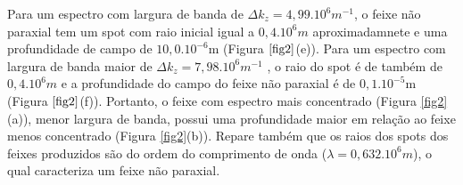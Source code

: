 Para um espectro com largura de banda de $\Delta k_z=4,99.10^{6}m^{-1}$, o feixe n\~ao paraxial tem um spot com raio inicial igual a $0,4.10^6m$ aproximadamnete e uma profundidade de campo de $10,0.10^{-6}$m (Figura $\ref{fig2}$(e)). Para um espectro com largura de banda maior de $\Delta k_z=7,98.10^{6}m^{-1}$ , o raio do spot \'e de tamb\'em de $0,4.10^6m$ e a profundidade do campo do feixe n\~ao paraxial \'e de $0,1.10^{-5}$m (Figura $\ref{fig2}$(f)). Portanto, o feixe com espectro mais concentrado (Figura \ref{fig2}(a)), menor largura de banda, possui uma profundidade maior em rela\c{c}\~ao ao feixe menos concentrado (Figura \ref{fig2}(b)). Repare tamb\'em que os raios dos spots dos feixes produzidos s\~ao do ordem do comprimento de onda ($\lambda = 0,632.10^6m$), o qual caracteriza um feixe n\~ao paraxial.  
